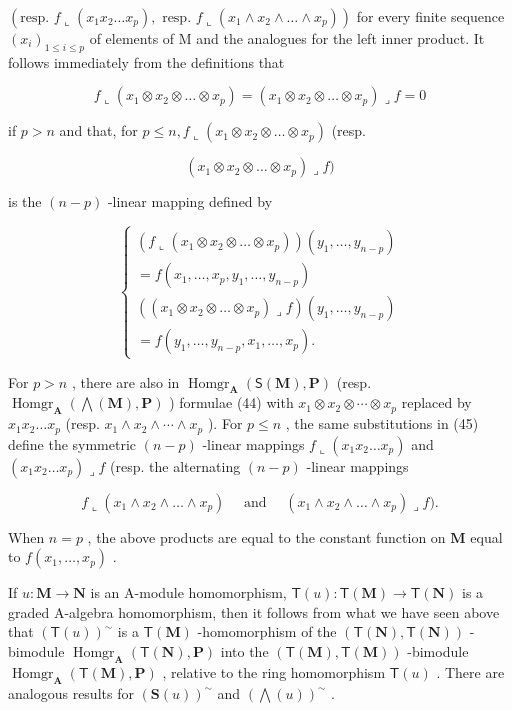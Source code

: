 \((\text{resp. } f \llcorner (x_1 x_2 \ldots x_p), \text{ resp. } f \llcorner (x_1 \wedge x_2 \wedge \dots \wedge x_p))\) for every finite sequence \((x_i)_{1 \leq i \leq p}\) of elements of M and the analogues for the left inner product. It follows immediately from the definitions that

\[
f \llcorner (x _ {1} \otimes x _ {2} \otimes \dots \otimes x _ {p}) = (x _ {1} \otimes x _ {2} \otimes \dots \otimes x _ {p}) \lrcorner f = 0\tag{44}
\]

if \(p > n\) and that, for \(p \leqslant n, f \llcorner (x_1 \otimes x_2 \otimes \dots \otimes x_p)\) (resp.

\[
\left(x _ {1} \otimes x _ {2} \otimes \dots \otimes x _ {p}\right) \lrcorner f)
\]

is the \((n - p)\) -linear mapping defined by

\[
\left\{ \begin{array}{l} (f \llcorner (x _ {1} \otimes x _ {2} \otimes \dots \otimes x _ {p})) (y _ {1}, \ldots , y _ {n - p}) \\ = f (x _ {1}, \ldots , x _ {p}, y _ {1}, \ldots , y _ {n - p}) \\ ((x _ {1} \otimes x _ {2} \otimes \dots \otimes x _ {p}) \lrcorner f) (y _ {1}, \ldots , y _ {n - p}) \\ = f (y _ {1}, \ldots , y _ {n - p}, x _ {1}, \ldots , x _ {p}). \end{array} \right.\tag{45}
\]

For \(p > n\) , there are also in \(\operatorname{Homgr}_{\mathbf{A}}(\mathsf{S}(\mathbf{M}), \mathbf{P})\) (resp. \(\operatorname{Homgr}_{\mathbf{A}}(\bigwedge(\mathbf{M}), \mathbf{P})\) ) formulae (44) with \(x_1 \otimes x_2 \otimes \cdots \otimes x_p\) replaced by \(x_1x_2 \ldots x_p\) (resp. \(x_1 \wedge x_2 \wedge \cdots \wedge x_p\) ). For \(p \leqslant n\) , the same substitutions in (45) define the symmetric \((n - p)\) -linear mappings \(f \llcorner (x_1x_2 \ldots x_p)\) and \((x_1x_2 \ldots x_p) \lrcorner f\) (resp. the alternating \((n - p)\) -linear mappings

\[
f \llcorner (x _ {1} \wedge x _ {2} \wedge \dots \wedge x _ {p}) \quad \text { and } \quad (x _ {1} \wedge x _ {2} \wedge \dots \wedge x _ {p}) \lrcorner f).
\]

When \(n = p\) , the above products are equal to the constant function on \(\mathbf{M}\) equal to \(f(x_{1},\ldots ,x_{p})\) .

If \(u: \mathbf{M} \to \mathbf{N}\) is an A-module homomorphism, \(\mathsf{T}(u): \mathsf{T}(\mathbf{M}) \to \mathsf{T}(\mathbf{N})\) is a graded A-algebra homomorphism, then it follows from what we have seen above that \((\mathsf{T}(u))^{\sim}\) is a \(\mathsf{T}(\mathbf{M})\) -homomorphism of the \((\mathsf{T}(\mathbf{N}), \mathsf{T}(\mathbf{N}))\) -bimodule \(\operatorname{Homgr}_{\mathbf{A}}(\mathsf{T}(\mathbf{N}), \mathbf{P})\) into the \((\mathsf{T}(\mathbf{M}), \mathsf{T}(\mathbf{M}))\) -bimodule \(\operatorname{Homgr}_{\mathbf{A}}(\mathsf{T}(\mathbf{M}), \mathbf{P})\) , relative to the ring homomorphism \(\mathsf{T}(u)\) . There are analogous results for \((\mathbf{S}(u))^{\sim}\) and \((\bigwedge(u))^{\sim}\) .
\relax{}
